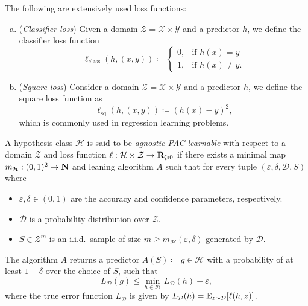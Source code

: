 \begin{example}
\label{exp:loss-functions}
The following are extensively used loss functions:
\begin{enumerate}[(a)]\setlength\itemsep{0em}
\item (\emph{Classifier loss}) Given a domain \(\mathcal{Z} = \mathcal{X} \times
  \mathcal{Y}\) and a predictor \(h\), we define the classifier loss function
  \[
  \ell_{\text{class}}(h, (x, y)) \coloneq
  \begin{cases}
    0, &\text{if } h(x) = y \\
    1, &\text{if } h(x) \neq y.
  \end{cases}
  \]

\item (\emph{Square loss}) Consider a domain \(\mathcal{Z} = \mathcal{X} \times
  \mathcal{Y}\) and a predictor \(h\), we define the square loss function as
  \[
  \ell_{\text{sq}}(h, (x, y)) \coloneq (h(x) - y)^2,
  \]
  which is commonly used in regression learning problems.
\end{enumerate}
\end{example}

\begin{definition}
\label{def:agnostic-pac-learning-model-loss-function}
A hypothesis class \(\mathcal{H}\) is said to be \emph{agnostic PAC learnable}
with respect to a domain \(\mathcal{Z}\) and loss function
\(\ell: \mathcal{H} \times \mathcal{Z} \to \mathbf{R}_{\geqslant 0}\) if there exists a
minimal map \(m_{\mathcal{H}}: (0, 1)^2 \to \mathbf{N}\) and leaning algorithm \(A\)
such that for every tuple \((\varepsilon, \delta, \mathcal{D}, S)\) where
\begin{itemize}\setlength\itemsep{0em}
\item \(\varepsilon, \delta \in (0, 1)\) are the accuracy and confidence
  parameters, respectively.
\item \(\mathcal{D}\) is a probability distribution over
  \(\mathcal{Z}\).
\item \(S \in \mathcal{Z}^m\) is an i.i.d.~sample of size
  \(m \geq m_{\mathcal{H}}(\varepsilon, \delta)\) generated by \(\mathcal{D}\).
\end{itemize}
The algorithm \(A\) returns a predictor \(A(S) \coloneq g \in \mathcal{H}\) with
a probability of at least \(1 - \delta\) over the choice of \(S\), such that
\[
L_{\mathcal{D}}(g) \leq \min_{h \in \mathcal{H}} L_{\mathcal{D}}(h) + \varepsilon,
\]
where the true error function \(L_{\mathcal{D}}\) is given by
\(L_{\mathcal{D}}(h) = \operatorname{\mathbb{E}}_{z \sim \mathcal{D}}[\ell(h, z)]\).
\end{definition}

